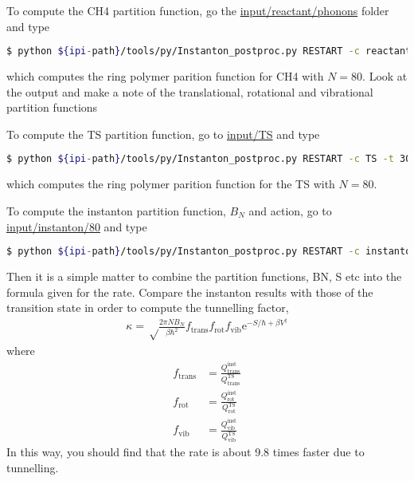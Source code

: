 \documentclass{article}
\begin{document}
\begin{Exercise}[label={post},title={Postprocessing for the rate calculation}]

\Question
To compute the CH4 partition function, go the \url{input/reactant/phonons} folder and type
\begin{lstlisting}[language=bash]
$ python ${ipi-path}/tools/py/Instanton_postproc.py RESTART -c reactant -t 300 -n 80 -f 5
\end{lstlisting}
which computes the ring polymer parition function for CH4 with $N=80$.
Look at the output and make a note of the translational, rotational and vibrational partition functions

\Question
To compute the TS partition function, go to \url{input/TS} and type
\begin{lstlisting}[language=bash]
$ python ${ipi-path}/tools/py/Instanton_postproc.py RESTART -c TS -t 300 -n 80
\end{lstlisting}
which computes the ring polymer parition function for the TS with $N=80$.

\Question
To compute the instanton partition function, $B_N$ and action,
go to \url{input/instanton/80} and type
\begin{lstlisting}[language=bash]
$ python ${ipi-path}/tools/py/Instanton_postproc.py RESTART -c instanton -t 300
\end{lstlisting}

Then it is a simple matter to combine the partition functions, BN, S etc into the formula given for the rate.
Compare the instanton results with those of the transition state in order to compute the tunnelling factor,
\begin{align}
	\kappa = \sqrt\frac{2\pi NB_N}{\beta \hbar^2}
		f_\text{trans} f_\text{rot} f_\text{vib}
		\mathrm{e}^{-S/\hbar+\beta V^\ddag}
\end{align}
where
\begin{align}
	f_\text{trans} &= \frac{Q_\text{trans}^\text{inst}}{Q_\text{trans}^\text{TS}} \\
	f_\text{rot} &= \frac{Q_\text{rot}^\text{inst}}{Q_\text{rot}^\text{TS}} \\
	f_\text{vib} &= \frac{Q_\text{vib}^\text{inst}}{Q_\text{vib}^\text{TS}}
\end{align}
In this way, you should find that the rate is about 9.8 times faster due to tunnelling.

\end{Exercise}




\end{document}
